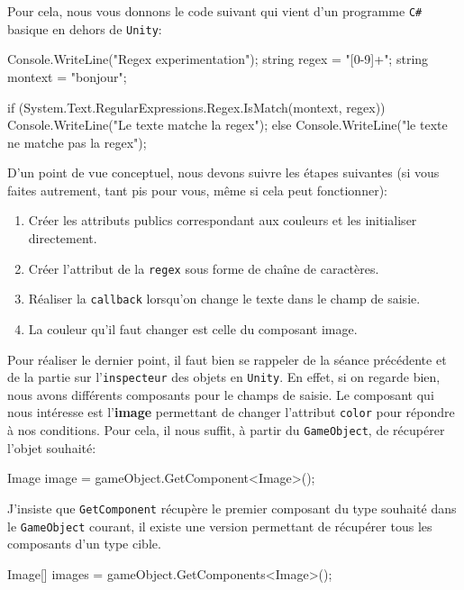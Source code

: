 \documentclass[a4paper,10pt]{article}
\newenvironment{info}%
{\begin{tcolorbox}[breakable,colback=green!5!white,colframe=green!75!black,title=Information]}%
{\end{tcolorbox}}
\newenvironment{boxcode}%
{\begin{tcolorbox}[breakable,colback=gray!5!white,colframe=black]}%
	{\end{tcolorbox}}
\begin{document}
Pour cela, nous vous donnons le code suivant qui vient d'un programme \texttt{C\#} basique en dehors de \texttt{Unity}:

\begin{boxcode}
\begin{csharpsansbord}
Console.WriteLine("Regex experimentation");
string regex = "[0-9]+";
string montext = "bonjour";

if (System.Text.RegularExpressions.Regex.IsMatch(montext, regex))
	Console.WriteLine("Le texte matche la regex");
else
	Console.WriteLine("le texte ne matche pas la regex");

\end{csharpsansbord}
\end{boxcode}


D'un point de vue conceptuel, nous devons suivre les étapes suivantes (si vous faites autrement, tant pis pour vous, même si cela peut fonctionner):
\begin{enumerate}
	\item Créer les attributs publics correspondant aux couleurs et les initialiser directement.
	\item Créer l'attribut de la \texttt{regex} sous forme de chaîne de caractères.
	\item Réaliser la \texttt{callback} lorsqu'on change le texte dans le champ de saisie.
	\item La couleur qu'il faut changer est celle du composant image.
\end{enumerate}

\begin{info}
Pour réaliser le dernier point, il faut bien se rappeler de la séance précédente et de la partie sur l'\texttt{inspecteur} des objets en \texttt{Unity}. En effet, si on regarde bien, nous avons différents composants pour le champs de saisie. Le composant qui nous intéresse est l'\textbf{image} permettant de changer l'attribut \texttt{color} pour répondre à nos conditions. Pour cela, il nous suffit, à partir du \texttt{GameObject}, de récupérer l'objet souhaité:

\begin{csharp}
Image image = gameObject.GetComponent<Image>();
\end{csharp}

J'insiste que \texttt{GetComponent} récupère le premier composant du type souhaité dans le \texttt{GameObject} courant, il existe une version permettant de récupérer tous les composants d'un type cible.
\begin{csharp}
Image[] images = gameObject.GetComponents<Image>();
\end{csharp}
\end{info}
\end{document}
